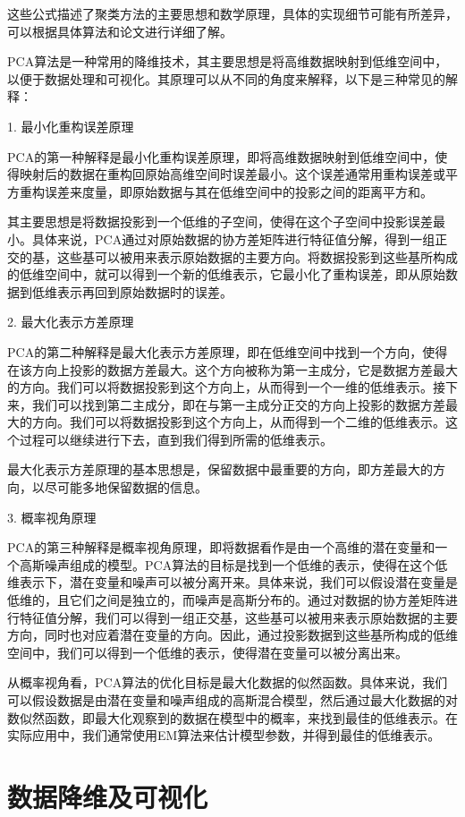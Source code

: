 \documentclass[lettersize,journal]{IEEEtran}
\begin{document}
这些公式描述了聚类方法的主要思想和数学原理，具体的实现细节可能有所差异，可以根据具体算法和论文进行详细了解。

PCA算法是一种常用的降维技术，其主要思想是将高维数据映射到低维空间中，以便于数据处理和可视化。其原理可以从不同的角度来解释，以下是三种常见的解释：

1. 最小化重构误差原理

PCA的第一种解释是最小化重构误差原理，即将高维数据映射到低维空间中，使得映射后的数据在重构回原始高维空间时误差最小。这个误差通常用重构误差或平方重构误差来度量，即原始数据与其在低维空间中的投影之间的距离平方和。

其主要思想是将数据投影到一个低维的子空间，使得在这个子空间中投影误差最小。具体来说，PCA通过对原始数据的协方差矩阵进行特征值分解，得到一组正交的基，这些基可以被用来表示原始数据的主要方向。将数据投影到这些基所构成的低维空间中，就可以得到一个新的低维表示，它最小化了重构误差，即从原始数据到低维表示再回到原始数据时的误差。

2. 最大化表示方差原理

PCA的第二种解释是最大化表示方差原理，即在低维空间中找到一个方向，使得在该方向上投影的数据方差最大。这个方向被称为第一主成分，它是数据方差最大的方向。我们可以将数据投影到这个方向上，从而得到一个一维的低维表示。接下来，我们可以找到第二主成分，即在与第一主成分正交的方向上投影的数据方差最大的方向。我们可以将数据投影到这个方向上，从而得到一个二维的低维表示。这个过程可以继续进行下去，直到我们得到所需的低维表示。

最大化表示方差原理的基本思想是，保留数据中最重要的方向，即方差最大的方向，以尽可能多地保留数据的信息。

3. 概率视角原理

PCA的第三种解释是概率视角原理，即将数据看作是由一个高维的潜在变量和一个高斯噪声组成的模型。PCA算法的目标是找到一个低维的表示，使得在这个低维表示下，潜在变量和噪声可以被分离开来。具体来说，我们可以假设潜在变量是低维的，且它们之间是独立的，而噪声是高斯分布的。通过对数据的协方差矩阵进行特征值分解，我们可以得到一组正交基，这些基可以被用来表示原始数据的主要方向，同时也对应着潜在变量的方向。因此，通过投影数据到这些基所构成的低维空间中，我们可以得到一个低维的表示，使得潜在变量可以被分离出来。

从概率视角看，PCA算法的优化目标是最大化数据的似然函数。具体来说，我们可以假设数据是由潜在变量和噪声组成的高斯混合模型，然后通过最大化数据的对数似然函数，即最大化观察到的数据在模型中的概率，来找到最佳的低维表示。在实际应用中，我们通常使用EM算法来估计模型参数，并得到最佳的低维表示。

\section{数据降维及可视化}
\end{document}
